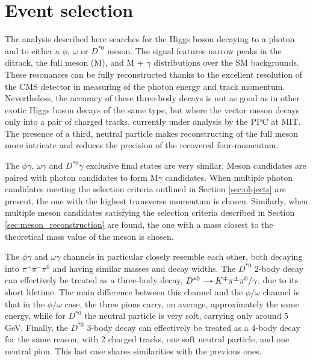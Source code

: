 \section{Event selection}\label{sec:event_selection}

The analysis described here searches for the Higgs boson decaying to a photon and to either a $\phi$, $\omega$ or $D^{*0}$ meson. The signal features narrow peaks in the ditrack, the full meson (M), and M + $\gamma$ distributions over the SM backgrounds. These resonances can be fully reconstructed thanks to the excellent resolution of the CMS detector in measuring of the photon energy and track momentum. Nevertheless, the accuracy of these three-body decays is not as good as in other exotic Higgs boson decays of the same type, but where the vector meson decays only into a pair of charged tracks, currently under analysis by the PPC at MIT. The presence of a third, neutral particle makes reconstructing of the full meson more intricate and reduces the precision of the recovered four-momentum.

The $\phi\gamma$, $\omega\gamma$ and $D^{*0}\gamma$ exclusive final states are very similar. Meson candidates are paired with photon candidates to form M$\gamma$ candidates. When multiple photon candidates meeting the selection criteria outlined in Section \ref{sec:objects} are present, the one with the highest transverse momentum is chosen. Similarly, when multiple meson candidates satisfying the selection criteria described in Section \ref{sec:meson_reconstruction} are found, the one with a mass closest to the theoretical mass value of the meson is chosen.

The $\phi\gamma$ and $\omega\gamma$ channels in particular closely resemble each other, both decaying into $\pi^{+}\pi^{-}\pi^0$ and having similar masses and decay widths. The $D^{*0}$ 2-body decay can effectively be treated as a three-body decay, $D^{*0}\decaysto K^{\mp}\pi^{\pm}\pi^0/\gamma$, due to its short lifetime. The main difference between this channel and the $\phi/\omega$ channel is that in the $\phi/\omega$ case, the three pions carry, on average, approximately the same energy, while for $D^{*0}$ the neutral particle is very soft, carrying only around 5 GeV. Finally, the $D^{*0}$ 3-body decay can effectively be treated as a 4-body decay for the same reason, with 2 charged tracks, one soft neutral particle, and one neutral pion. This last case shares similarities with the previous ones.

